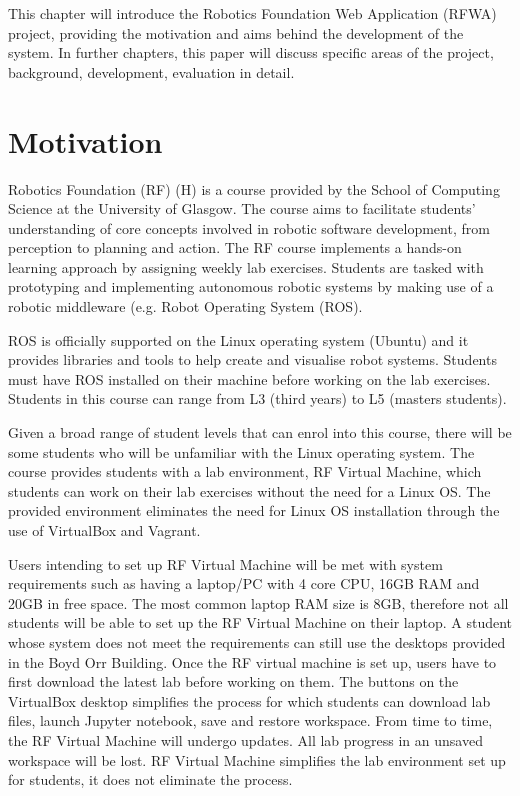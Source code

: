 \documentclass{l4proj}
\begin{document}
This chapter will introduce the Robotics Foundation Web Application (RFWA) project, providing the motivation and aims behind the development of the system. In further chapters, this paper will discuss specific areas of the project, background, development, evaluation in detail.
 

\section{Motivation}

Robotics Foundation (RF) (H) is a course provided by the School of Computing Science at the University of Glasgow. The course aims to facilitate students' understanding of core concepts involved in robotic software development, from perception to planning and action. The RF course implements a hands-on learning approach by assigning weekly lab exercises. Students are tasked with prototyping and implementing autonomous robotic systems by making use of a robotic middleware (e.g. Robot Operating System (ROS). 

ROS is officially supported on the Linux operating system (Ubuntu) and it provides libraries and tools to help create and visualise robot systems. Students must have ROS installed on their machine before working on the lab exercises. Students in this course can range from L3 (third years) to L5 (masters students). 

Given a broad range of student levels that can enrol into this course, there will be some students who will be unfamiliar with the Linux operating system. The course provides students with a lab environment, RF Virtual Machine, which students can work on their lab exercises without the need for a Linux OS. The provided environment eliminates the need for Linux OS installation through the use of VirtualBox and Vagrant.

Users intending to set up RF Virtual Machine will be met with system requirements such as having a laptop/PC with 4 core CPU, 16GB RAM and 20GB in free space. The most common laptop RAM size is 8GB, therefore not all students will be able to set up the RF Virtual Machine on their laptop. A student whose system does not meet the requirements can still use the desktops provided in the Boyd Orr Building. Once the RF virtual machine is set up, users have to first download the latest lab before working on them. The buttons on the VirtualBox desktop simplifies the process for which students can download lab files, launch Jupyter notebook, save and restore workspace. From time to time, the RF Virtual Machine will undergo updates. All lab progress in an unsaved workspace will be lost. RF Virtual Machine simplifies the lab environment set up for students, it does not eliminate the process.
\end{document}
